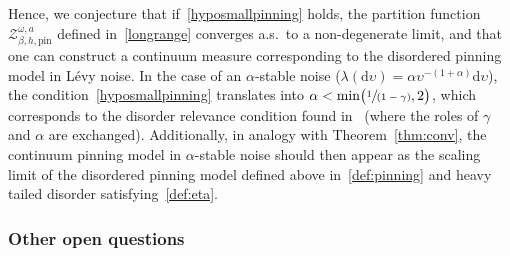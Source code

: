 \documentclass[JEP,XML,SOM,Unicode,published]{cedram}
\let\mathcal\mathscr
\newcommand{\spfrac}[2]{\sfrac{#1}{(#2)}}
\theoremstyle{definition}
\newcommand{\dd}{\mathrm{d}}
\newcommand{\cZ}{{\ensuremath{\mathcal Z}} }
\let\ga\alpha
\let\gb\beta
\let\ups\upsilon
\let\go\omega
\begin{document}
Hence, we conjecture that if~\eqref{hyposmallpinning} holds, the partition function~$\cZ_{\gb,h,\mathrm{pin}}^{\go,a}$ defined in~\eqref{longrange} converges a.s.\ to a non-degenerate limit, and that one can construct a continuum measure corresponding to the disordered pinning model in Lévy noise.
In the case of an $\ga$-stable noise (\ie $\lambda(\dd \ups) = \ga \ups^{-(1+\ga)} \dd \ups$),
the condition~\eqref{hyposmallpinning} translates into $\ga < \min \bigl(\spfrac{1}{1-\gamma}, 2 \bigr)$,
which corresponds to the disorder relevance condition found in~\cite{LS17} (where the roles of $\gamma$ and $\alpha$ are exchanged).
Additionally, in analogy with Theorem~\ref{thm:conv}, the continuum pinning model in $\ga$-stable noise should then appear
as the scaling limit of the disordered pinning model defined
above in~\eqref{def:pinning}
and heavy tailed disorder satisfying~\eqref{def:eta}.

\subsubsection{Other open questions}
\end{document}
